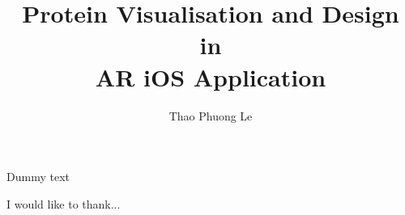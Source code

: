 \documentclass[MSCIM]{mscim}
\begin{document}

\title{Protein Visualisation and Design\\ in \\ AR iOS Application}
\author{Thao Phuong Le}

\beforeabstract

Dummy text

\afterabstract


 I would like to thank...
 
 
\afterpreface







%
%




\printbibliography
\end{document}
